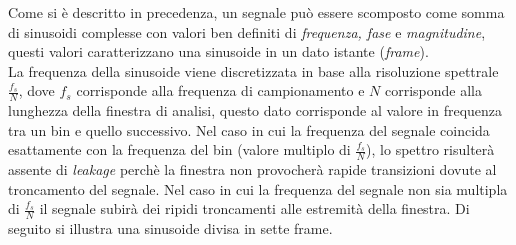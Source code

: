 \documentclass[12pt]{report}
\begin{document}
Come si è descritto in precedenza, un segnale può essere scomposto come somma di sinusoidi complesse con valori ben definiti di {\itshape frequenza, fase} e {\itshape magnitudine}, questi valori caratterizzano una sinusoide in un dato istante ({\itshape frame}).\\
La frequenza della sinusoide viene discretizzata in base alla risoluzione spettrale $\frac{f_s}{N}$, dove $f_s$ corrisponde alla frequenza di campionamento e $N$ corrisponde alla lunghezza della finestra di analisi, questo dato corrisponde al valore in frequenza tra un bin e quello successivo. Nel caso in cui la frequenza del segnale coincida esattamente con la frequenza del bin (valore multiplo di $\frac{f_s}{N}$), lo spettro risulterà assente di {\itshape leakage} perchè la finestra non provocherà rapide transizioni dovute al troncamento del segnale. Nel caso in cui la frequenza del segnale non sia multipla di $\frac{f_s}{N}$ il segnale subirà dei ripidi troncamenti alle estremità della finestra. Di seguito si illustra una sinusoide divisa in sette frame.
\end{document}
